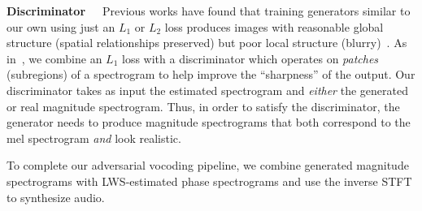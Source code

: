 \documentclass[a4paper]{article}
\begin{document}
\textbf{Discriminator}~~~Previous works have
found
that training generators similar to our own using just an $L_1$ or $L_2$ loss produces images with reasonable global structure (spatial relationships preserved) but poor local structure (blurry)~\cite{pathakCVPR16context,zhang2016colorful}.
As in~\cite{pix2pix}, we combine an $L_1$ loss with a discriminator which operates on \emph{patches} (subregions) of a spectrogram to help improve the ``sharpness'' of the output.
Our discriminator takes as input the estimated spectrogram and \emph{either} the generated or real magnitude spectrogram. 
Thus, in order to satisfy the discriminator, the generator needs to produce magnitude spectrograms that both correspond to the mel spectrogram \emph{and} look realistic.

To complete our adversarial vocoding pipeline, we combine generated magnitude spectrograms with LWS-estimated phase spectrograms and use the inverse STFT to synthesize audio.
\end{document}
